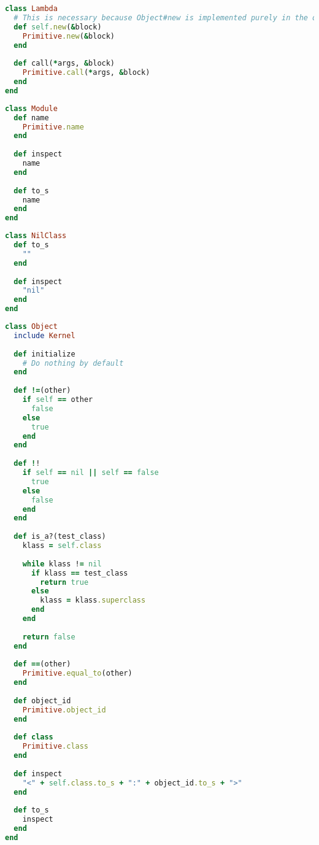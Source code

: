 \begin{lstlisting}[title={\small\Helvetica kernel/lambda.carat},language=Ruby]
class Lambda
  # This is necessary because Object#new is implemented purely in the object language
  def self.new(&block)
    Primitive.new(&block)
  end
  
  def call(*args, &block)
    Primitive.call(*args, &block)
  end
end

\end{lstlisting}
\begin{lstlisting}[title={\small\Helvetica kernel/module.carat},language=Ruby]
class Module
  def name
    Primitive.name
  end
  
  def inspect
    name
  end
  
  def to_s
    name
  end
end

\end{lstlisting}
\begin{lstlisting}[title={\small\Helvetica kernel/nil\_class.carat},language=Ruby]
class NilClass
  def to_s
    ""
  end
  
  def inspect
    "nil"
  end
end

\end{lstlisting}
\begin{lstlisting}[title={\small\Helvetica kernel/object.carat},language=Ruby]
class Object
  include Kernel
  
  def initialize
    # Do nothing by default
  end
  
  def !=(other)
    if self == other
      false
    else
      true
    end
  end
  
  def !!
    if self == nil || self == false
      true
    else
      false
    end
  end
  
  def is_a?(test_class)
    klass = self.class
    
    while klass != nil
      if klass == test_class
        return true
      else
        klass = klass.superclass
      end
    end
    
    return false
  end
  
  def ==(other)
    Primitive.equal_to(other)
  end
  
  def object_id
    Primitive.object_id
  end
  
  def class
    Primitive.class
  end
  
  def inspect
    "<" + self.class.to_s + ":" + object_id.to_s + ">"
  end
  
  def to_s
    inspect
  end
end

\end{lstlisting}
